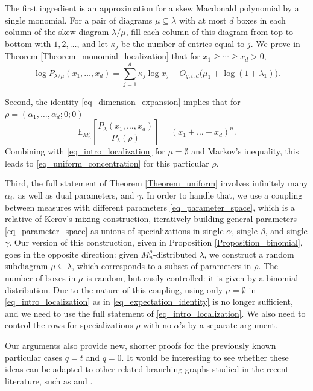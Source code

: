 \documentclass[11pt,reqno]{amsart}
\theoremstyle{definition}
\theoremstyle{remark}
\numberwithin{equation}{section}
\newcommand{\E}{\mathbb E}
\begin{document}
The first ingredient is an approximation for a skew Macdonald polynomial by a single monomial. For a pair of diagrams $\mu\subseteq\lambda$
with at most $d$ boxes in each column of the skew diagram $\lambda/\mu$, fill each column of this diagram from top to
bottom with $1,2,\ldots$, and let $\kappa_j$ be the number of entries
equal to $j$. We prove in Theorem \ref{Theorem_monomial_localization} that for $x_1\ge\cdots\ge x_d>0$,
\begin{equation}\label{eq_intro_localization}
 \log P_{\lambda/\mu}(x_1,\ldots,x_d)
 = \sum_{j=1}^d\kappa_j\log x_j + O_{q,t,d}\bigl(\mu_1+\log(1+\lambda_1)\bigr).
\end{equation}

Second, the identity \eqref{eq_dimension_expansion} implies that for $\rho=(\alpha_1,\dots,\alpha_d; 0; 0)$
\begin{equation}
\label{eq_expectation_identity}
 \E_{M^{\rho}_n} \left[\frac{P_\lambda(x_1,\dots,x_d)}{P_\lambda(\rho)} \right]= (x_1+\dots+x_d)^n.
\end{equation}
Combining with \eqref{eq_intro_localization} for $\mu=\emptyset$ and Markov's inequality, this leads to \eqref{eq_uniform_concentration} for this particular $\rho$.

Third, the full statement of Theorem \ref{Theorem_uniform} involves infinitely many $\alpha_i$, as well as dual parameters, and $\gamma$. In order to handle that, we use a coupling between measures with different parameters \eqref{eq_parameter_space}, which is a relative of Kerov's mixing construction, iteratively building general parameters \eqref{eq_parameter_space} as unions of specializations in single $\alpha$, single $\beta$, and single $\gamma$. Our version of this construction, given in Proposition \ref{Proposition_binomial}, goes in the opposite direction: given $M_n^\rho$-distributed $\lambda$, we construct a random subdiagram $\mu\subseteq\lambda$, which corresponds to a subset of parameters in $\rho$. The number of boxes in $\mu$ is random, but easily controlled: it is given by a binomial distribution. Due to the nature of this coupling, using only $\mu=\emptyset$ in \eqref{eq_intro_localization} as in \eqref{eq_expectation_identity} is no longer sufficient, and we need to use the full statement of \eqref{eq_intro_localization}. We also need to control the rows for specializations $\rho$ with no $\alpha$'s by a separate argument.

\bigskip

Our arguments also provide new, shorter proofs for the previously known particular cases $q=t$ and $q=0$. It would be interesting to see whether these ideas can be adapted to other related branching graphs studied in the recent literature, such as \cite{GK26} and \cite{CO26}.
\end{document}
